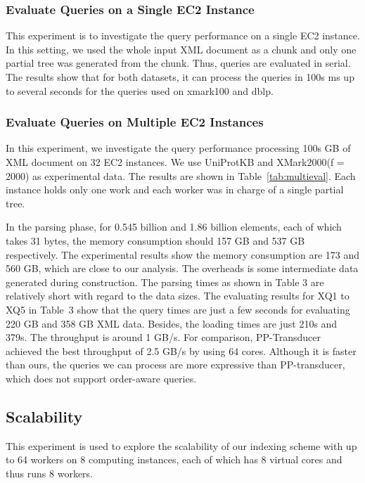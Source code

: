\subsubsection{Evaluate Queries on a Single EC2 Instance}

This experiment is to investigate the query performance on a single EC2
instance. In this setting, we used the whole input XML document as a chunk and
only one partial tree was generated from the chunk. Thus, queries are evaluated
in serial. The results show that for both datasets, it can process the queries
in 100s ms up to several seconds for the queries used on xmark100 and dblp.


\subsubsection{Evaluate Queries on Multiple EC2 Instances}

In this experiment, we investigate the query performance processing 100s GB of
XML document on 32 EC2 instances. We use UniProtKB and XMark2000(f = 2000) as
experimental data. The results are shown in Table~\ref{tab:multieval}. Each
instance holds only one work and each worker was in charge of a single partial
tree.

In the parsing phase, for 0.545 billion and 1.86 billion elements, each of which
takes 31 bytes, the memory consumption should 157 GB and 537 GB respectively.
The experimental results show the memory consumption are 173 and 560 GB, which
are close to our analysis.  The overheads is some intermediate data generated
during construction. The parsing times as shown in Table 3 are relatively short
with regard to the data sizes. The evaluating results for XQ1 to XQ5 in Table~3
show that  the query times are just a few seconds for evaluating 220 GB and 358
GB XML data.  Besides, the loading times are just 210s and 379s.  The throughput
is around 1 GB/s. For comparison, PP-Transducer~\cite{OgTP13} achieved the best
throughput of 2.5 GB/s by using 64 cores. Although it is faster than ours, the
queries we can process are more expressive than PP-transducer, which does not
support order-aware queries.

 

\subsection{Scalability}

This experiment is used to explore the scalability of our indexing scheme with up
to 64 workers on 8 computing instances, each of which has 8 virtual cores and
thus runs 8 workers.

